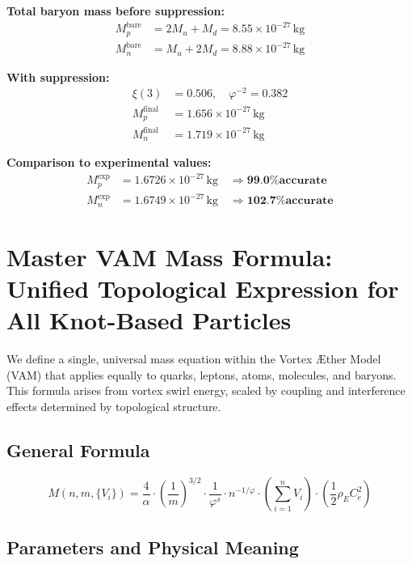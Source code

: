 \documentclass[12pt]{article}
\begin{document}
\textbf{Total baryon mass before suppression:}
\begin{align*}
M_p^{\text{bare}} &= 2M_u + M_d = 8.55 \times 10^{-27} \, \text{kg} \\
M_n^{\text{bare}} &= M_u + 2M_d = 8.88 \times 10^{-27} \, \text{kg}
\end{align*}

\textbf{With suppression:}
\begin{align*}
\xi(3) &= 0.506, \quad \varphi^{-2} = 0.382 \\
M_p^{\text{final}} &= 1.656 \times 10^{-27} \, \text{kg} \\
M_n^{\text{final}} &= 1.719 \times 10^{-27} \, \text{kg}
\end{align*}

\textbf{Comparison to experimental values:}
\begin{align*}
M_p^{\text{exp}} &= 1.6726 \times 10^{-27} \, \text{kg} \quad \Rightarrow \textbf{99.0\% accurate} \\
M_n^{\text{exp}} &= 1.6749 \times 10^{-27} \, \text{kg} \quad \Rightarrow \textbf{102.7\% accurate}
\end{align*}
\section*{Master VAM Mass Formula: Unified Topological Expression for All Knot-Based Particles}

We define a single, universal mass equation within the Vortex Æther Model (VAM) that applies equally to quarks, leptons, atoms, molecules, and baryons. This formula arises from vortex swirl energy, scaled by coupling and interference effects determined by topological structure.

\subsection*{General Formula}

\[
\boxed{
M(n, m, \{V_i\}) = \frac{4}{\alpha} \cdot \left( \frac{1}{m} \right)^{3/2} \cdot \frac{1}{\varphi^s} \cdot n^{-1/\varphi} \cdot \left( \sum_{i=1}^n V_i \right) \cdot \left( \frac{1}{2} \rho_{\scriptscriptstyle\boldsymbol\!E}C_e^2 \right)
}
\]

\subsection*{Parameters and Physical Meaning}
\end{document}
